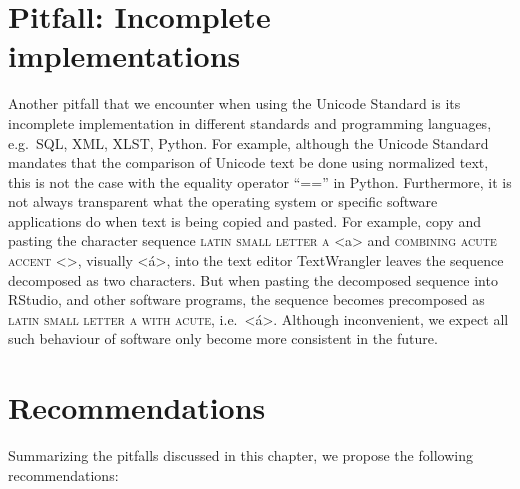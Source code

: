 \section{Pitfall: Incomplete implementations}
\label{incomplete-implementations}
Another pitfall that we encounter when using the Unicode Standard is its incomplete implementation in different standards and programming languages, e.g.\ SQL, XML, XLST, Python. For example, although the Unicode Standard mandates that the comparison of Unicode text be done using normalized text, this is not the case with the equality operator ``=='' in Python. Furthermore, it is not always transparent what the operating system or specific software applications do when text is being copied and pasted. For example, copy and pasting the character sequence  \textsc{latin small letter a} <a> and  \textsc{combining acute accent} <>, visually <á>, into the text editor TextWrangler leaves the sequence decomposed as two characters. But when pasting the decomposed sequence into RStudio, and other software programs, the sequence becomes precomposed as  \textsc{latin small letter a with acute}, i.e.\ <á>. Although inconvenient, we expect all such behaviour of software only become more consistent in the future.



\section{Recommendations}
\label{recommendations}

Summarizing the pitfalls discussed in this chapter, we propose the following 
recommendations:

